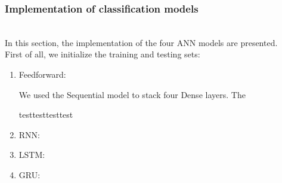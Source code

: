 \subsubsection{Implementation of classification models}~\\

In this section, the implementation of the four ANN models are presented.\\

First of all, we initialize the training and testing sets:


\begin{enumerate}[label=\arabic*.]
  \item Feedforward:
    
    We used the Sequential model to stack four Dense layers. The
  \begin{normalize}
    testtesttesttest 
  \end{normalize}
  \item RNN:
    
  \item LSTM:
    
  \item GRU:
    
\end{enumerate}


